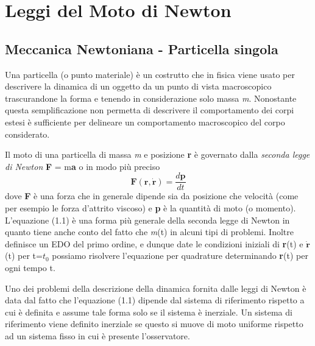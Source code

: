 \setcounter{chapter}{0}
\chapter{Leggi del Moto di Newton}

\section{Meccanica Newtoniana - Particella singola}

Una particella (o punto materiale) \`{e} un costrutto che in fisica viene usato per descrivere la dinamica di un oggetto da un punto di vista macroscopico trascurandone la forma e tenendo in considerazione solo massa \textit{m}. Nonostante questa semplificazione non permetta di descrivere il comportamento dei corpi estesi \`{e} sufficiente per delineare un comportamento macroscopico del corpo considerato.
\newline

Il moto di una particella di massa \textit{m} e posizione \textbf{r} \`{e} governato dalla \textit{seconda legge di Newton} \textbf{F} = m\textbf{a} o in modo pi\`{u} preciso
\begin{equation}
	\textbf{F}(\textbf{r},\dot{\textbf{r}}) = \frac{d\textbf{p}}{dt}
\end{equation}
dove \textbf{F} \`{e} una forza che in generale dipende sia da posizione che velocit\`a (come per esempio le forza d'attrito viscoso) e \textbf{p} \`{e} la quantit\`{a} di moto (o momento). L'equazione (1.1) \`{e} una forma pi\`{u} generale della seconda legge di Newton in quanto tiene anche conto del fatto che \textit{m}(t) in alcuni tipi di problemi. Inoltre definisce un EDO del primo ordine, e dunque date le condizioni iniziali di \textbf{r}(t) e $\dot{\textbf{r}}$(t) per t=$t_0$ possiamo risolvere l'equazione per quadrature determinando \textbf{r}(t) per ogni tempo t.

Uno dei problemi della descrizione della dinamica fornita dalle leggi di Newton \`{e} data dal fatto che l'equazione (1.1) dipende dal sistema di riferimento rispetto a cui \`{e} definita e assume tale forma solo se il sistema \`{e} inerziale. Un sistema di riferimento viene definito inerziale se questo si muove di moto uniforme rispetto ad un sistema fisso in cui \`{e} presente l'osservatore.

